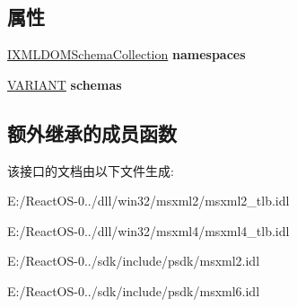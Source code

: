 \subsection*{属性}
\begin{DoxyCompactItemize}
\item 
\mbox{\label{interface_m_s_x_m_l2_1_1_i_x_m_l_d_o_m_document2_aa460956a691f70754cb719157d9cf7e2}} 
\hyperlink{interface_m_s_x_m_l2_1_1_i_x_m_l_d_o_m_schema_collection}{I\+X\+M\+L\+D\+O\+M\+Schema\+Collection} {\bfseries namespaces}
\item 
\mbox{\label{interface_m_s_x_m_l2_1_1_i_x_m_l_d_o_m_document2_ace8bec6b4bf5243fa28b00ac39c6fd7d}} 
\hyperlink{structtag_v_a_r_i_a_n_t}{V\+A\+R\+I\+A\+NT} {\bfseries schemas}
\end{DoxyCompactItemize}
\subsection*{额外继承的成员函数}


该接口的文档由以下文件生成\+:\begin{DoxyCompactItemize}
\item 
E\+:/\+React\+O\+S-\/0../dll/win32/msxml2/msxml2\+\_\+tlb.\+idl\item 
E\+:/\+React\+O\+S-\/0../dll/win32/msxml4/msxml4\+\_\+tlb.\+idl\item 
E\+:/\+React\+O\+S-\/0../sdk/include/psdk/msxml2.\+idl\item 
E\+:/\+React\+O\+S-\/0../sdk/include/psdk/msxml6.\+idl\end{DoxyCompactItemize}

